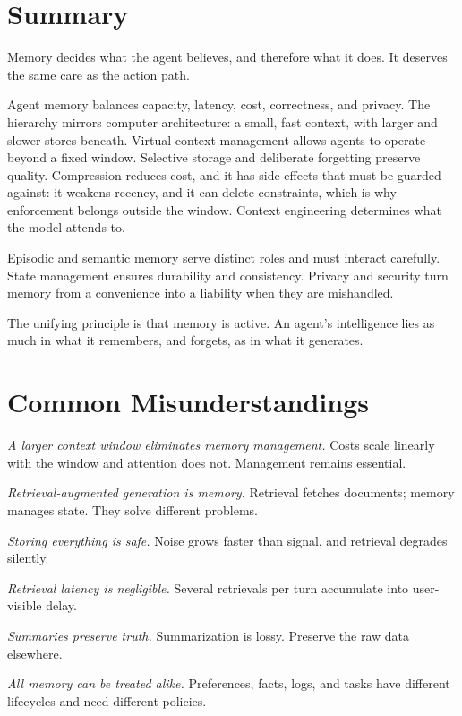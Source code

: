 \documentclass[11pt]{book}
\begin{document}
\section{Summary}

Memory decides what the agent believes, and therefore what it does. It deserves the same care as the action path.

Agent memory balances capacity, latency, cost, correctness, and privacy. The hierarchy mirrors computer architecture: a small, fast context, with larger and slower stores beneath. Virtual context management allows agents to operate beyond a fixed window. Selective storage and deliberate forgetting preserve quality. Compression reduces cost, and it has side effects that must be guarded against: it weakens recency, and it can delete constraints, which is why enforcement belongs outside the window. Context engineering determines what the model attends to.

Episodic and semantic memory serve distinct roles and must interact carefully. State management ensures durability and consistency. Privacy and security turn memory from a convenience into a liability when they are mishandled.

The unifying principle is that memory is active. An agent's intelligence lies as much in what it remembers, and forgets, as in what it generates.

\section{Common Misunderstandings}

\textit{A larger context window eliminates memory management.} Costs scale linearly with the window and attention does not. Management remains essential.

\textit{Retrieval-augmented generation is memory.} Retrieval fetches documents; memory manages state. They solve different problems.

\textit{Storing everything is safe.} Noise grows faster than signal, and retrieval degrades silently.

\textit{Retrieval latency is negligible.} Several retrievals per turn accumulate into user-visible delay.

\textit{Summaries preserve truth.} Summarization is lossy. Preserve the raw data elsewhere.

\textit{All memory can be treated alike.} Preferences, facts, logs, and tasks have different lifecycles and need different policies.
\end{document}
